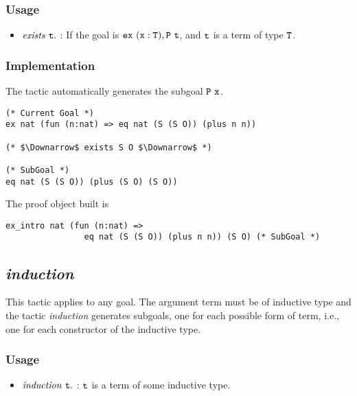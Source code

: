 \subsubsection*{Usage}
\begin{itemize}
\item ${\it exists}\ \tt t.$ : If the goal is $\tt ex\ (x:T),P\ t$, and $\tt t$ is a term of type $\tt T$. 
\end{itemize}

\subsubsection*{Implementation}
The tactic automatically generates the subgoal $\tt P\ x$.
\begin{center}
\begin{minipage}{0.7\textwidth}
\begin{verbatim}
(* Current Goal *)                                                           
ex nat (fun (n:nat) => eq nat (S (S O)) (plus n n))

(* $\Downarrow$ exists S O $\Downarrow$ *)

(* SubGoal *)
eq nat (S (S O)) (plus (S O) (S O))
\end{verbatim}
\end{minipage}
\end{center}

The proof object built is
\begin{center}
\begin{minipage}{0.8\textwidth}
\begin{verbatim}
ex_intro nat (fun (n:nat) => 
                eq nat (S (S O)) (plus n n)) (S O) (* SubGoal *)
\end{verbatim}
\end{minipage}
\end{center}

\subsection{\it induction}

This tactic applies to any goal. 
The argument term must be of inductive type and the tactic {\it induction} generates subgoals, 
one for each possible form of term, i.e., one for each constructor of the inductive type.

\subsubsection*{Usage}
\begin{itemize}
\item ${\it induction}\ \tt t.$ : $\tt t$ is a term of some inductive type.
\end{itemize}

